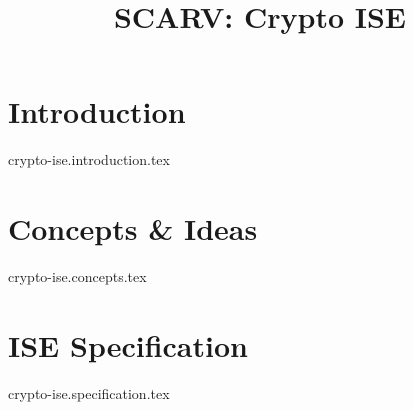 \documentclass{article}
\title{SCARV: Crypto ISE}
\begin{document}
\maketitle
\tableofcontents

\section{Introduction}
{crypto-ise.introduction.tex}

\section{Concepts \& Ideas}
{crypto-ise.concepts.tex}

\section{ISE Specification}
{crypto-ise.specification.tex}


\printbibliography
\end{document}
